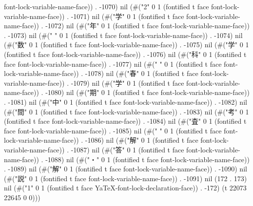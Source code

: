 font-lock-variable-name-face)) . -1070) nil (#("2" 0 1 (fontified t face font-lock-variable-name-face)) . -1071) nil (#("学" 0 1 (fontified t face font-lock-variable-name-face)) . -1072) nil (#("年" 0 1 (fontified t face font-lock-variable-name-face)) . -1073) nil (#(" " 0 1 (fontified t face font-lock-variable-name-face)) . -1074) nil (#("数" 0 1 (fontified t face font-lock-variable-name-face)) . -1075) nil (#("学" 0 1 (fontified t face font-lock-variable-name-face)) . -1076) nil (#("科" 0 1 (fontified t face font-lock-variable-name-face)) . -1077) nil (#(" " 0 1 (fontified t face font-lock-variable-name-face)) . -1078) nil (#("春" 0 1 (fontified t face font-lock-variable-name-face)) . -1079) nil (#("学" 0 1 (fontified t face font-lock-variable-name-face)) . -1080) nil (#("期" 0 1 (fontified t face font-lock-variable-name-face)) . -1081) nil (#("中" 0 1 (fontified t face font-lock-variable-name-face)) . -1082) nil (#("間" 0 1 (fontified t face font-lock-variable-name-face)) . -1083) nil (#("考" 0 1 (fontified t face font-lock-variable-name-face)) . -1084) nil (#("査" 0 1 (fontified t face font-lock-variable-name-face)) . -1085) nil (#(" " 0 1 (fontified t face font-lock-variable-name-face)) . -1086) nil (#("解" 0 1 (fontified t face font-lock-variable-name-face)) . -1087) nil (#("答" 0 1 (fontified t face font-lock-variable-name-face)) . -1088) nil (#("・" 0 1 (fontified t face font-lock-variable-name-face)) . -1089) nil (#("解" 0 1 (fontified t face font-lock-variable-name-face)) . -1090) nil (#("説" 0 1 (fontified t face font-lock-variable-name-face)) . -1091) nil (172 . 173) nil (#("1" 0 1 (fontified t face YaTeX-font-lock-declaration-face)) . -172) (t 22073 22645 0 0)))
